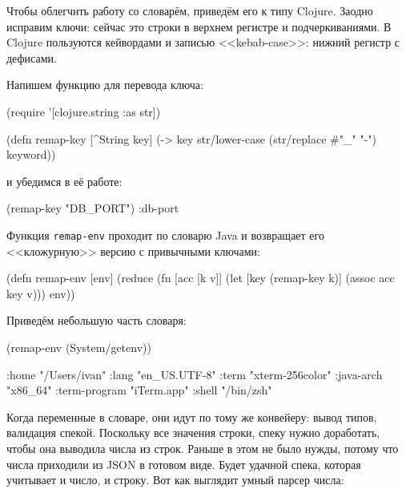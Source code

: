 Чтобы облегчить работу со словарём, приведём его к типу Clojure. Заодно исправим
ключи: сейчас это строки в верхнем регистре и подчеркиваниями. В Clojure
пользуются кейвордами и записью <<kebab-case>>: нижний регистр с дефисами.


Напишем функцию для перевода ключа:

\begin{english}
  \begin{clojure}
(require '[clojure.string :as str])

(defn remap-key [^String key]
  (-> key
      str/lower-case
      (str/replace #"_" "-")
      keyword))
  \end{clojure}
\end{english}

\noindent
и убедимся в её работе:

\begin{english}
  \begin{clojure}
(remap-key "DB_PORT")
:db-port
  \end{clojure}
\end{english}


Функция \verb|remap-env| проходит по словарю Java и возвращает его
<<кложурную>> версию с привычными ключами:

\begin{english}
  \begin{clojure}
(defn remap-env [env]
  (reduce
   (fn [acc [k v]]
     (let [key (remap-key k)]
       (assoc acc key v)))
   {}
   env))
  \end{clojure}
\end{english}

\noindent
Приведём небольшую часть словаря:

\begin{english}
  \begin{clojure}
(remap-env (System/getenv))

{:home "/Users/ivan"
 :lang "en_US.UTF-8"
 :term "xterm-256color"
 :java-arch "x86_64"
 :term-program "iTerm.app"
 :shell "/bin/zsh"}
  \end{clojure}
\end{english}

Когда переменные в словаре, они идут по тому же конвейеру: вывод типов,
валидация спекой. Поскольку все значения строки, спеку нужно доработать, чтобы
она выводила числа из строк. Раньше в этом не было нужды, потому что числа
приходили из JSON в готовом виде. Будет удачной спека, которая учитывает и
число, и строку. Вот как выглядит умный парсер числа:

